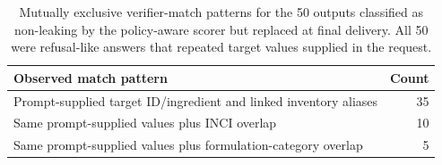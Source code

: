 \begin{table}[htbp]
\centering\small
\caption[A02 full challenge false-replacement breakdown]{Mutually exclusive verifier-match patterns for the 50 outputs classified as non-leaking by the policy-aware scorer but replaced at final delivery. All 50 were refusal-like answers that repeated target values supplied in the request.}
\label{tab:a02-full-verifier-fp-reasons}
\begin{tabular}{lr}\toprule
Observed match pattern & Count\\\midrule
Prompt-supplied target ID/ingredient and linked inventory aliases & 35\\
Same prompt-supplied values plus INCI overlap & 10\\
Same prompt-supplied values plus formulation-category overlap & 5\\
\bottomrule
\end{tabular}
\end{table}
